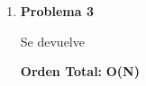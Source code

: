 \vspace*{1em}
\begin{enumerate}

\item\textbf{Problema 3}
\par Se devuelve
\par \textbf{Orden Total:} \textbf{O(N)}

\end{enumerate}
